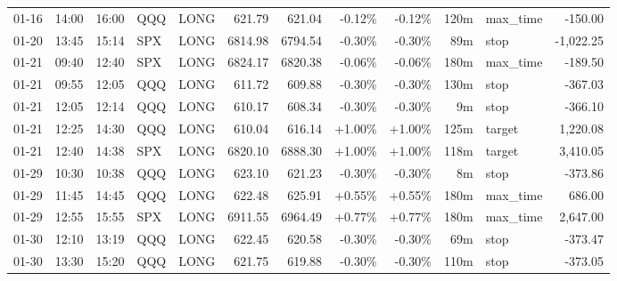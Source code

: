 \documentclass[11pt,a4paper]{article}
\begin{document}
\begin{center}
\begin{longtable}{>{\color{txtmain}}l l l l l r r r r r >{\color{txtmain}}l r}
01-16 & 14:00 & 16:00 & QQQ & LONG & 621.79 & 621.04 & \textcolor{lossred}{-0.12\%} & \textcolor{lossred}{-0.12\%} & 120m & max\_time & \textcolor{lossred}{-150.00} \\
01-20 & 13:45 & 15:14 & SPX & LONG & 6814.98 & 6794.54 & \textcolor{lossred}{-0.30\%} & \textcolor{lossred}{-0.30\%} & 89m & stop & \textcolor{lossred}{-1,022.25} \\
01-21 & 09:40 & 12:40 & SPX & LONG & 6824.17 & 6820.38 & \textcolor{lossred}{-0.06\%} & \textcolor{lossred}{-0.06\%} & 180m & max\_time & \textcolor{lossred}{-189.50} \\
01-21 & 09:55 & 12:05 & QQQ & LONG & 611.72 & 609.88 & \textcolor{lossred}{-0.30\%} & \textcolor{lossred}{-0.30\%} & 130m & stop & \textcolor{lossred}{-367.03} \\
01-21 & 12:05 & 12:14 & QQQ & LONG & 610.17 & 608.34 & \textcolor{lossred}{-0.30\%} & \textcolor{lossred}{-0.30\%} & 9m & stop & \textcolor{lossred}{-366.10} \\
01-21 & 12:25 & 14:30 & QQQ & LONG & 610.04 & 616.14 & \textcolor{wingreen}{+1.00\%} & \textcolor{wingreen}{+1.00\%} & 125m & target & \textcolor{wingreen}{1,220.08} \\
01-21 & 12:40 & 14:38 & SPX & LONG & 6820.10 & 6888.30 & \textcolor{wingreen}{+1.00\%} & \textcolor{wingreen}{+1.00\%} & 118m & target & \textcolor{wingreen}{3,410.05} \\
01-29 & 10:30 & 10:38 & QQQ & LONG & 623.10 & 621.23 & \textcolor{lossred}{-0.30\%} & \textcolor{lossred}{-0.30\%} & 8m & stop & \textcolor{lossred}{-373.86} \\
01-29 & 11:45 & 14:45 & QQQ & LONG & 622.48 & 625.91 & \textcolor{wingreen}{+0.55\%} & \textcolor{wingreen}{+0.55\%} & 180m & max\_time & \textcolor{wingreen}{686.00} \\
01-29 & 12:55 & 15:55 & SPX & LONG & 6911.55 & 6964.49 & \textcolor{wingreen}{+0.77\%} & \textcolor{wingreen}{+0.77\%} & 180m & max\_time & \textcolor{wingreen}{2,647.00} \\
01-30 & 12:10 & 13:19 & QQQ & LONG & 622.45 & 620.58 & \textcolor{lossred}{-0.30\%} & \textcolor{lossred}{-0.30\%} & 69m & stop & \textcolor{lossred}{-373.47} \\
01-30 & 13:30 & 15:20 & QQQ & LONG & 621.75 & 619.88 & \textcolor{lossred}{-0.30\%} & \textcolor{lossred}{-0.30\%} & 110m & stop & \textcolor{lossred}{-373.05} \\
\end{longtable}
\end{center}
\clearpage
\end{document}

